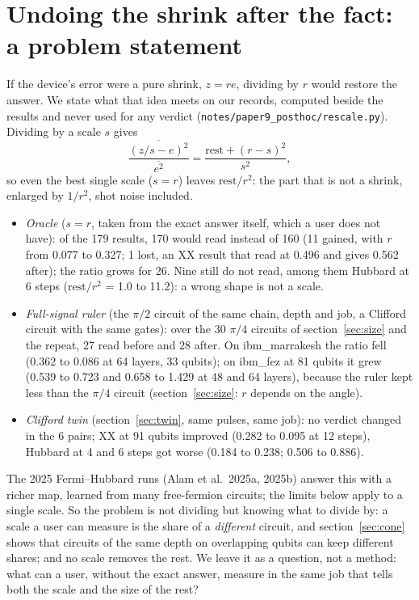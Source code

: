 \documentclass[10pt,a4paper]{article}
\begin{document}
\section{Undoing the shrink after the fact: a problem statement}\label{sec:posthoc}
If the device's error were a pure shrink, $z = re$, dividing by $r$ would restore the answer. We state what that idea
meets on our records, computed beside the results and never used for any verdict (\texttt{notes/paper9\_posthoc/rescale.py}).
Dividing by a scale $s$ gives
\[ \frac{\overline{(z/s - e)^2}}{\overline{e^2}} = \frac{\text{rest} + (r - s)^2}{s^2}, \]
so even the best single scale ($s = r$) leaves $\text{rest}/r^2$: the part that is not a shrink, enlarged by $1/r^2$,
shot noise included.
\begin{itemize}
\item \emph{Oracle} ($s = r$, taken from the exact answer itself, which a user does not have): of the 179 results, 170
would read instead of 160 (11 gained, with $r$ from 0.077 to 0.327; 1 lost, an XX result that read at 0.496 and gives
0.562 after); the ratio grows for 26. Nine still do not read, among them Hubbard at 6 steps ($\text{rest}/r^2$ = 1.0 to
11.2): a wrong shape is not a scale.
\item \emph{Full-signal ruler} (the $\pi/2$ circuit of the same chain, depth and job, a Clifford circuit with the same
gates): over the 30 $\pi/4$ circuits of section~\ref{sec:size} and the repeat, 27 read before and 28 after. On
ibm\_marrakesh the ratio fell (0.362 to 0.086 at 64 layers, 33 qubits); on ibm\_fez at 81 qubits it grew (0.539 to
0.723 and 0.658 to 1.429 at 48 and 64 layers), because the ruler kept less than the $\pi/4$ circuit (section~\ref{sec:size}:
$r$ depends on the angle).
\item \emph{Clifford twin} (section~\ref{sec:twin}, same pulses, same job): no verdict changed in the 6 pairs; XX at
91 qubits improved (0.282 to 0.095 at 12 steps), Hubbard at 4 and 6 steps got worse (0.184 to 0.238; 0.506 to 0.886).
\end{itemize}
The 2025 Fermi--Hubbard runs (Alam et al.\ 2025a, 2025b) answer this with a richer map, learned from many free-fermion
circuits; the limits below apply to a single scale. So the problem is not dividing but knowing what to divide by: a scale a user can measure is the share of a
\emph{different} circuit, and section~\ref{sec:cone} shows that circuits of the same depth on overlapping qubits can
keep different shares; and no scale removes the rest. We leave it as a question, not a method: what can a user, without
the exact answer, measure in the same job that tells both the scale and the size of the rest?
\end{document}
